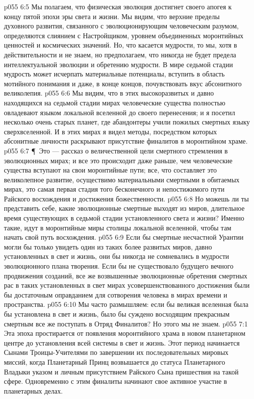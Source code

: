 \vs p055 6:5 Мы полагаем, что физическая эволюция достигнет своего апогея к концу пятой эпохи эры света и жизни. Мы видим, что верхние пределы духовного развития, связанного с эволюционирующим человеческим разумом, определяются слиянием с Настройщиком, уровнем объединенных моронтийных ценностей и космических значений. Но, что касается мудрости, то мы, хотя в действительности и не знаем, но предполагаем, что никогда не будет предела интеллектуальной эволюции и обретению мудрости. В мире седьмой стадии мудрость может исчерпать материальные потенциалы, вступить в область мотийного понимания и даже, в конце концов, почувствовать вкус абсонитного великолепия.
\vs p055 6:6 Мы видим, что в этих высокоразвитых и давно находящихся на седьмой стадии мирах человеческие существа полностью овладевают языком локальной вселенной до своего перенесения; и я посетил несколько очень старых планет, где абандонтеры учили пожилых смертных языку сверхвселенной. И в этих мирах я видел методы, посредством которых абсонитные личности раскрывают присутствие финалитов в моронтийном храме.
\vs p055 6:7 \P\ Это --- рассказ о величественной цели смертного стремления в эволюционных мирах; и все это происходит даже раньше, чем человеческие существа вступают на свои моронтийные пути; все, что составляет это великолепное развитие, осуществимо материальными смертными в обитаемых мирах, это самая первая стадия того бесконечного и непостижимого пути Райского восхождения и достижения божественности.
\vs p055 6:8 Но можешь ли ты представить себе, какие эволюционные смертные выходят из миров, длительное время существующих в седьмой стадии установленного света и жизни? Именно такие, идут в моронтийные миры столицы локальной вселенной, чтобы там начать свой путь восхождения.
\vs p055 6:9 Если бы смертные несчастной Урантии могли бы только увидеть один из таких более развитых миров, давно установленных в свет и жизнь, они бы никогда не сомневались в мудрости эволюционного плана творения. Если бы не существовало будущего вечного продвижения созданий, все же возвышенные эволюционные обретения смертных рас в таких установленных в свет мирах усовершенствованного достижения были бы достаточным оправданием для сотворения человека в мирах времени и пространства.
\vs p055 6:10 Мы часто размышляем: если бы великая вселенная была бы установлена в свет и жизнь, было бы суждено восходящим прекрасным смертным все же поступать в Отряд Финалитов? Но этого мы не знаем.
\vs p055 7:1 Эта эпоха простирается от появления моронтийного храма в новом планетарном центре до установления всей системы в свет и жизнь. Этот период начинается Сынами Троицы\hyp{}Учителями по завершении их последовательных мировых миссий, когда Планетарный Принц возвышается до статуса Планетарного Владыки указом и личным присутствием Райского Сына пришествия на такой сфере. Одновременно с этим финалиты начинают свое активное участие в планетарных делах.

